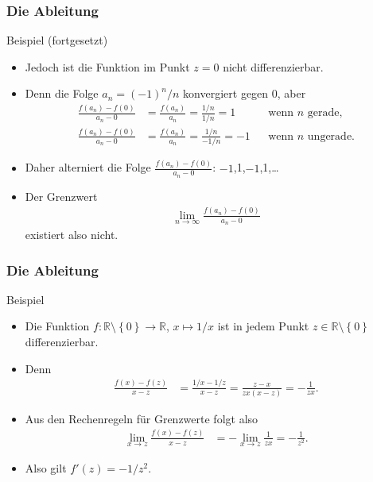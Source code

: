 \documentclass{beamer}
\newcommand\RR{\mathbb R}
\newcommand\cbc[1]{\left\{{#1}\right\}}
\newcommand{\ue}{\"u}
\newcommand{\mytitle}{Die Ableitung}
\begin{document}
\begin{frame}\frametitle{\mytitle}
	\begin{block}{Beispiel (fortgesetzt)}
		\begin{itemize}
			\item Jedoch ist die Funktion im Punkt $z=0$ \alert{nicht} differenzierbar.
			\item Denn die Folge $a_n=(-1)^n/n$ konvergiert gegen $0$, aber 
				\begin{align*}
					\frac{f(a_n)-f(0)}{a_n-0}&=\frac{f(a_n)}{a_n}=\frac{1/n}{1/n}=1&&\mbox{wenn $n$ gerade},\\
					\frac{f(a_n)-f(0)}{a_n-0}&=\frac{f(a_n)}{a_n}=\frac{1/n}{-1/n}=-1&&\mbox{wenn $n$ ungerade}.
				\end{align*}
			\item Daher alterniert die Folge $\frac{f(a_n)-f(0)}{a_n-0}$: $-1$,1,$-1$,1,\ldots
			\item Der Grenzwert
				\begin{align*}
					\lim_{n\to\infty}\frac{f(a_n)-f(0)}{a_n-0}
				\end{align*}
				existiert also nicht.
		\end{itemize}
	\end{block}
\end{frame}

\begin{frame}\frametitle{\mytitle}
	\begin{block}{Beispiel}
		\begin{itemize}
			\item Die Funktion $f:\RR\setminus\cbc 0\to\RR$, $x\mapsto 1/x$ ist in jedem Punkt $z\in\RR\setminus\cbc 0$ differenzierbar.
			\item Denn 
				\begin{align*}
					\frac{f(x)-f(z)}{x-z}&=\frac{1/x-1/z}{x-z}=\frac{z-x}{zx(x-z)}=-\frac{1}{zx}.
				\end{align*}
			\item Aus den Rechenregeln f\ue r Grenzwerte folgt also
				\begin{align*}
				\lim_{x\to z}\frac{f(x)-f(z)}{x-z}&=-\lim_{x\to z}\frac{1}{zx}=-\frac{1}{z^2}.
				\end{align*}
			\item Also gilt $f'(z)=-1/z^2$.
		\end{itemize}
	\end{block}
\end{frame}
\end{document}
